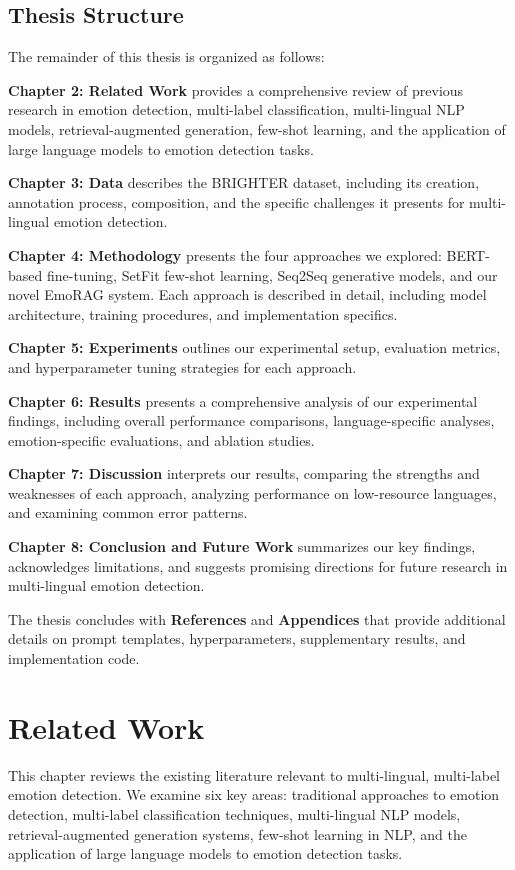 \documentclass[a4paper,12pt]{extarticle}
\begin{document}
\subsection{Thesis Structure}

The remainder of this thesis is organized as follows:

\textbf{Chapter 2: Related Work} provides a comprehensive review of previous research in emotion detection, multi-label classification, multi-lingual NLP models, retrieval-augmented generation, few-shot learning, and the application of large language models to emotion detection tasks.

\textbf{Chapter 3: Data} describes the BRIGHTER dataset, including its creation, annotation process, composition, and the specific challenges it presents for multi-lingual emotion detection.

\textbf{Chapter 4: Methodology} presents the four approaches we explored: BERT-based fine-tuning, SetFit few-shot learning, Seq2Seq generative models, and our novel EmoRAG system. Each approach is described in detail, including model architecture, training procedures, and implementation specifics.

\textbf{Chapter 5: Experiments} outlines our experimental setup, evaluation metrics, and hyperparameter tuning strategies for each approach.

\textbf{Chapter 6: Results} presents a comprehensive analysis of our experimental findings, including overall performance comparisons, language-specific analyses, emotion-specific evaluations, and ablation studies.

\textbf{Chapter 7: Discussion} interprets our results, comparing the strengths and weaknesses of each approach, analyzing performance on low-resource languages, and examining common error patterns.

\textbf{Chapter 8: Conclusion and Future Work} summarizes our key findings, acknowledges limitations, and suggests promising directions for future research in multi-lingual emotion detection.

The thesis concludes with \textbf{References} and \textbf{Appendices} that provide additional details on prompt templates, hyperparameters, supplementary results, and implementation code.

\section{Related Work}

This chapter reviews the existing literature relevant to multi-lingual, multi-label emotion detection. We examine six key areas: traditional approaches to emotion detection, multi-label classification techniques, multi-lingual NLP models, retrieval-augmented generation systems, few-shot learning in NLP, and the application of large language models to emotion detection tasks.
\end{document}
